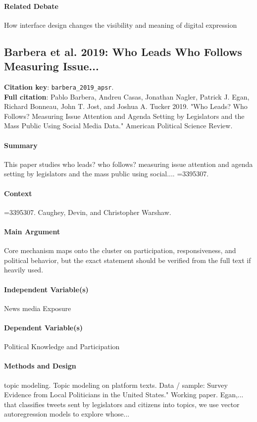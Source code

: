 \documentclass[12pt]{article}
\begin{document}
\paragraph{Related Debate} How interface design changes the visibility and meaning of digital expression


\subsection{Barbera et al. 2019: Who Leads Who Follows Measuring Issue...}
\textbf{Citation key}: \texttt{barbera\_2019\_apsr}.\\
\textbf{Full citation}: Pablo Barbera, Andreu Casas, Jonathan Nagler, Patrick J. Egan, Richard Bonneau, John T. Jost, and Joshua A. Tucker 2019. "Who Leads? Who Follows? Measuring Issue Attention and Agenda Setting by Legislators and the Mass Public Using Social Media Data." American Political Science Review.

\paragraph{Summary} This paper studies who leads? who follows? measuring issue attention and agenda setting by legislators and the mass public using social.... =3395307.

\paragraph{Context} =3395307. Caughey, Devin, and Christopher Warshaw.

\paragraph{Main Argument} Core mechanism maps onto the cluster on participation, responsiveness, and political behavior, but the exact statement should be verified from the full text if heavily used.

\paragraph{Independent Variable(s)} News media Exposure

\paragraph{Dependent Variable(s)} Political Knowledge and Participation

\paragraph{Methods and Design} topic modeling. Topic modeling on platform texts. Data / sample: Survey Evidence from Local Politicians in the United States." Working paper. Egan,... that classifies tweets sent by legislators and citizens into topics, we use vector autoregression models to explore whose...
\end{document}
